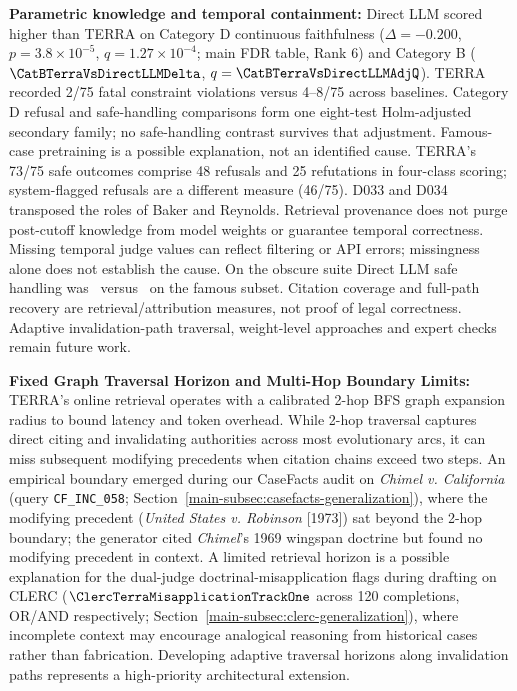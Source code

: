 \item \textbf{Parametric knowledge and temporal containment:} Direct LLM scored higher than TERRA on Category D continuous faithfulness ($\Delta=-0.200$, $p=3.8\times10^{-5}$, $q=1.27\times10^{-4}$; main FDR table, Rank 6) and Category B ($\CatBTerraVsDirectLLMDelta$, $q=\CatBTerraVsDirectLLMAdjQ$). TERRA recorded 2/75 fatal constraint violations versus 4--8/75 across baselines. Category D refusal and safe-handling comparisons form one eight-test Holm-adjusted secondary family; no safe-handling contrast survives that adjustment. Famous-case pretraining is a possible explanation, not an identified cause. TERRA's 73/75 safe outcomes comprise 48 refusals and 25 refutations in four-class scoring; system-flagged refusals are a different measure (46/75). D033 and D034 transposed the roles of Baker and Reynolds. Retrieval provenance does not purge post-cutoff knowledge from model weights or guarantee temporal correctness. Missing temporal judge values can reflect filtering or API errors; missingness alone does not establish the cause. On the obscure suite Direct LLM safe handling was \ObscDirectSafePct\ versus \ObscCrossDirectFamousSafe\ on the famous subset. Citation coverage and full-path recovery are retrieval/attribution measures, not proof of legal correctness. Adaptive invalidation-path traversal, weight-level approaches and expert checks remain future work.

\item \textbf{Fixed Graph Traversal Horizon and Multi-Hop Boundary Limits:} TERRA's online retrieval operates with a calibrated 2-hop BFS graph expansion radius to bound latency and token overhead. While 2-hop traversal captures direct citing and invalidating authorities across most evolutionary arcs, it can miss subsequent modifying precedents when citation chains exceed two steps. An empirical boundary emerged during our CaseFacts audit on \textit{Chimel v. California} (query \texttt{CF\_INC\_058}; Section~\ref{main-subsec:casefacts-generalization}), where the modifying precedent (\textit{United States v. Robinson} [1973]) sat beyond the 2-hop boundary; the generator cited \textit{Chimel}'s 1969 wingspan doctrine but found no modifying precedent in context. A limited retrieval horizon is a possible explanation for the dual-judge doctrinal-misapplication flags during drafting on CLERC ($\ClercTerraMisapplicationTrackOne$ across 120 completions, OR/AND respectively; Section~\ref{main-subsec:clerc-generalization}), where incomplete context may encourage analogical reasoning from historical cases rather than fabrication. Developing adaptive traversal horizons along invalidation paths represents a high-priority architectural extension.

